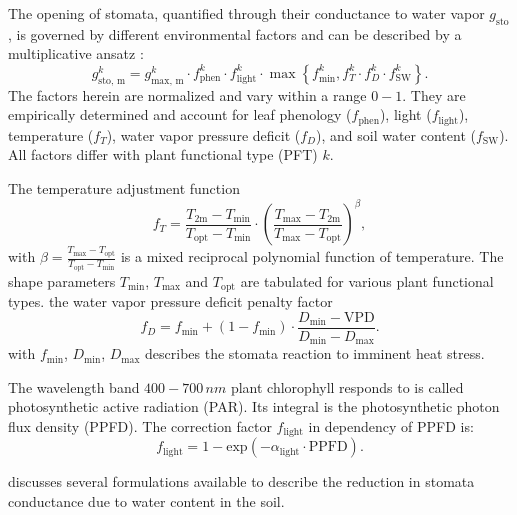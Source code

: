\documentclass[bg, manuscript]{copernicus}
\begin{document}
The opening of stomata, quantified through their conductance to water vapor $g_\mathrm{sto}$, is governed by different environmental factors and can be described by a multiplicative ansatz \citep{PTRS:Jarvis1976,ICP:MappingManual2017}:
\begin{equation}
  g^k_\text{sto, m} = g^k_\text{max, m} \cdot f^k_\text{phen} \cdot f^k_\text{light} \cdot \max{\left\{f^k_\text{min}, f^k_T \cdot f^k_D \cdot f^k_\text{SW}\right\}}.
  \label{eq:stomatal}
\end{equation}
%
The factors herein are normalized and vary within a range $0-1$. They are empirically determined and account for leaf phenology ($f_\text{phen}$), light ($f_\text{light}$), temperature ($f_T$), water vapor pressure deficit ($f_D$), and soil water content ($f_\text{SW}$). All factors differ with plant functional type (PFT) $k$.

The temperature adjustment function
%
\begin{equation}
  f_T = \frac{T_\text{2m}-T_\text{min}}{T_\text{opt}-T_\text{min}} \cdot \left(\frac{T_{\text{max}}-T_\text{2m}}{T_{\text{max}}-T_\text{opt}}\right)^\beta,
  \label{eq:f_temp}
\end{equation}
with $\beta = \frac{T_\text{max}-T_\text{opt}}{T_\text{opt}-T_\text{min}}$ is a mixed reciprocal polynomial function of temperature. The shape parameters $T_\text{min}$, $T_\text{max}$ and $T_\text{opt}$ are tabulated for various plant functional types.
%
the water vapor pressure deficit penalty factor
%
\begin{equation}
  f_D = f_\text{min}+(1-f_\text{min}) \cdot \frac{D_\text{min} - \text{VPD}}{D_\text{min}-D_\text{max}}.
  \label{eq:f_vpd}
\end{equation}
%
with $f_\text{min}$, $D_\text{min}$, $D_\text{max}$ describes the stomata reaction to imminent heat stress.

The wavelength band $400-700\,\unit{nm}$ plant chlorophyll responds to is called photosynthetic active radiation (PAR). Its integral is the photosynthetic photon flux density (PPFD). The correction factor $f_\mathrm{light}$ in dependency of PPFD is:
\begin{equation}
  f_\text{light} = 1-\text{exp}(-\alpha_\text{light}\cdot \text{PPFD}).
  \label{eq:flight}
\end{equation}


\citet{ACP:Bueker2012} discusses several formulations available to describe the reduction in stomata conductance due to water content in the soil.
\end{document}
